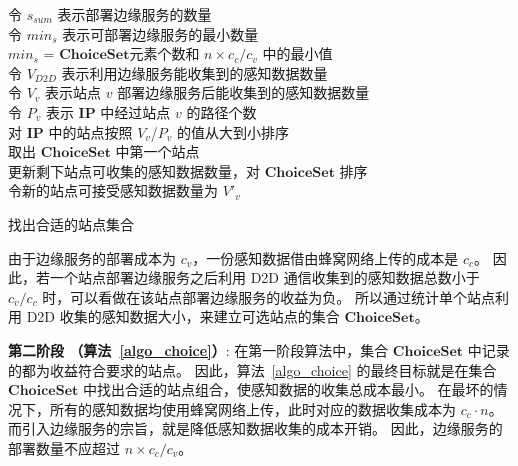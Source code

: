 \begin{algorithm}[!b]
\setstretch{\algostretch}
令 $s_{sum}$ 表示部署边缘服务的数量\\
令 $min_s$ 表示可部署边缘服务的最小数量\\
$min_s$ = $\boldsymbol{ChoiceSet}$元素个数和 $n \times c_c/c_v$ 中的最小值\\
令 $V_{D2D}$ 表示利用边缘服务能收集到的感知数据数量\\
令 $V_v$ 表示站点 $v$ 部署边缘服务后能收集到的感知数据数量\\
令 $P_v$ 表示 $\boldsymbol{IP}$ 中经过站点 $v$ 的路径个数\\
对 $\boldsymbol{IP}$ 中的站点按照 $V_v$/$P_v$ 的值从大到小排序\\
取出 $\boldsymbol{ChoiceSet}$ 中第一个站点\\
更新剩下站点可收集的感知数据数量，对 $\boldsymbol{ChoiceSet}$ 排序\\
令新的站点可接受感知数据数量为 $V'_v$\\
\caption{找出合适的站点集合}
\label{algo_choice}
\end{algorithm}

由于边缘服务的部署成本为 $c_v$，一份感知数据借由蜂窝网络上传的成本是  $c_c$。
因此，若一个站点部署边缘服务之后利用 D2D 通信收集到的感知数据总数小于 $c_v/c_c$ 时，可以看做在该站点部署边缘服务的收益为负。
所以通过统计单个站点利用 D2D 收集的感知数据大小，来建立可选站点的集合 $\boldsymbol{ChoiceSet}$。

\textbf{第二阶段 （算法~\ref{algo_choice}）}:
在第一阶段算法中，集合 $\boldsymbol{ChoiceSet}$ 中记录的都为收益符合要求的站点。
因此，算法~\ref{algo_choice} 的最终目标就是在集合 $\boldsymbol{ChoiceSet}$ 中找出合适的站点组合，使感知数据的收集总成本最小。
在最坏的情况下，所有的感知数据均使用蜂窝网络上传，此时对应的数据收集成本为 $c_c \cdot n$。
而引入边缘服务的宗旨，就是降低感知数据收集的成本开销。
因此，边缘服务的部署数量不应超过 $n\times c_c / c_v$。


